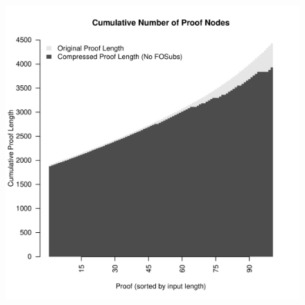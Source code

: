 \begin{figure}
\includegraphics[scale=0.5]{images/cumulative_res_nodes_no_subs_top100.pdf}
\end{figure}

